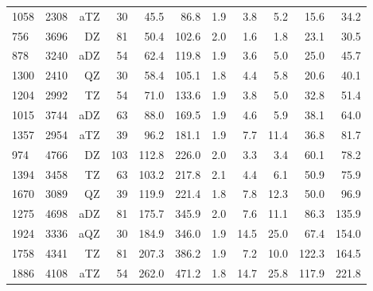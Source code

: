 \begin{table}[H]
\begin{tabular}{lrrrrrrrrrr}
1058 &2308&   aTZ& 30&                45.5&                86.8 & 1.9 &                3.8 &                5.2 &               15.6 &               34.2\\
 756 &3696&    DZ& 81&                50.4&               102.6 & 2.0 &                1.6 &                1.8 &               23.1 &               30.5\\
 878 &3240&   aDZ& 54&                62.4&               119.8 & 1.9 &                3.6 &                5.0 &               25.0 &               45.7\\
1300 &2410&    QZ& 30&                58.4&               105.1 & 1.8 &                4.4 &                5.8 &               20.6 &               40.1\\
1204 &2992&    TZ& 54&                71.0&               133.6 & 1.9 &                3.8 &                5.0 &               32.8 &               51.4\\
1015 &3744&   aDZ& 63&                88.0&               169.5 & 1.9 &                4.6 &                5.9 &               38.1 &               64.0\\
1357 &2954&   aTZ& 39&                96.2&               181.1 & 1.9 &                7.7 &               11.4 &               36.8 &               81.7\\
 974 &4766&    DZ&103&               112.8&               226.0 & 2.0 &                3.3 &                3.4 &               60.1 &               78.2\\
1394 &3458&    TZ& 63&               103.2&               217.8 & 2.1 &                4.4 &                6.1 &               50.9 &               75.9\\
1670 &3089&    QZ& 39&               119.9&               221.4 & 1.8 &                7.8 &               12.3 &               50.0 &               96.9\\
1275 &4698&   aDZ& 81&               175.7&               345.9 & 2.0 &                7.6 &               11.1 &               86.3 &              135.9\\
1924 &3336&   aQZ& 30&               184.9&               346.0 & 1.9 &               14.5 &               25.0 &               67.4 &              154.0\\
1758 &4341&    TZ& 81&               207.3&               386.2 & 1.9 &                7.2 &               10.0 &              122.3 &              164.5\\
1886 &4108&   aTZ& 54&               262.0&               471.2 & 1.8 &               14.7 &               25.8 &              117.9 &              221.8\\

\end{tabular}
\end{table}
